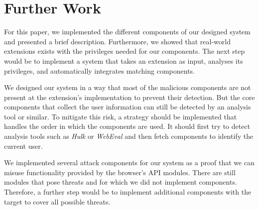 
\chapter{Further Work}

	For this paper, we implemented the different components of our designed system and presented a brief description. Furthermore, we showed that real-world extensions exists with the privileges needed for our components. The next step would be to implement a system that takes an extension as input, analyses its privileges, and automatically integrates matching components. 

	We designed our system in a way that most of the malicious components are not present at the extension's implementation to prevent their detection. But the core components that collect the user information can still be detected by an analysis tool or similar. To mitigate this risk, a strategy should be implemented that handles the order in which the components are used. It should first try to detect analysis tools such as \textit{Hulk}\cite{184485} or \textit{WebEval}\cite{190984} and then fetch components to identify the current user.
	
	We implemented several attack components for our system as a proof that we can misuse functionality provided by the browser's API modules. There are still modules that pose threats and for which we did not implement components. Therefore, a further step would be to implement additional components with the target to cover all possible threats. 